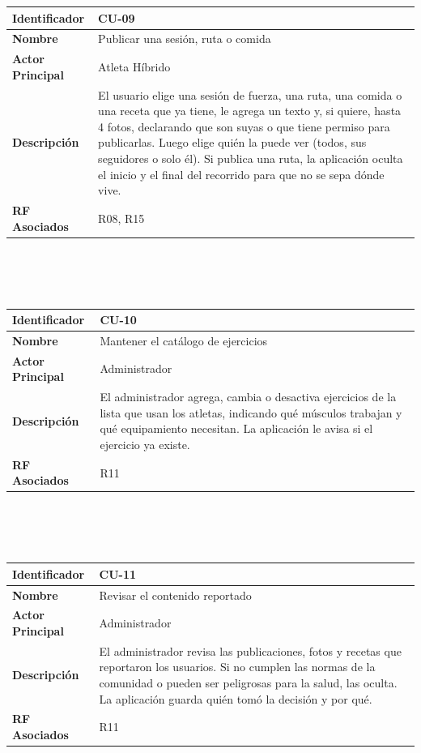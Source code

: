 \newpage
\begin{tabular}{|p{3.5cm}|p{11.5cm}|}
    \hline
    \rowcolor[HTML]{EFEFEF}
    \textbf{Identificador} & \textbf{CU-09} \\ \hline
    \textbf{Nombre} & Publicar una sesión, ruta o comida \\ \hline
    \textbf{Actor Principal} & Atleta Híbrido \\ \hline
    \textbf{Descripción} & El usuario elige una sesión de fuerza, una ruta, una comida o una receta que ya tiene, le agrega un texto y, si quiere, hasta 4 fotos, declarando que son suyas o que tiene permiso para publicarlas. Luego elige quién la puede ver (todos, sus seguidores o solo él). Si publica una ruta, la aplicación oculta el inicio y el final del recorrido para que no se sepa dónde vive. \\ \hline
    \textbf{RF Asociados} & R08, R15 \\ \hline
\end{tabular}
\\\\\\
\begin{tabular}{|p{3.5cm}|p{11.5cm}|}
    \hline
    \rowcolor[HTML]{EFEFEF}
    \textbf{Identificador} & \textbf{CU-10} \\ \hline
    \textbf{Nombre} & Mantener el catálogo de ejercicios \\ \hline
    \textbf{Actor Principal} & Administrador \\ \hline
    \textbf{Descripción} & El administrador agrega, cambia o desactiva ejercicios de la lista que usan los atletas, indicando qué músculos trabajan y qué equipamiento necesitan. La aplicación le avisa si el ejercicio ya existe. \\ \hline
    \textbf{RF Asociados} & R11 \\ \hline
\end{tabular}
\\\\\\
\begin{tabular}{|p{3.5cm}|p{11.5cm}|}
    \hline
    \rowcolor[HTML]{EFEFEF}
    \textbf{Identificador} & \textbf{CU-11} \\ \hline
    \textbf{Nombre} & Revisar el contenido reportado \\ \hline
    \textbf{Actor Principal} & Administrador \\ \hline
    \textbf{Descripción} & El administrador revisa las publicaciones, fotos y recetas que reportaron los usuarios. Si no cumplen las normas de la comunidad o pueden ser peligrosas para la salud, las oculta. La aplicación guarda quién tomó la decisión y por qué. \\ \hline
    \textbf{RF Asociados} & R11 \\ \hline
\end{tabular}
